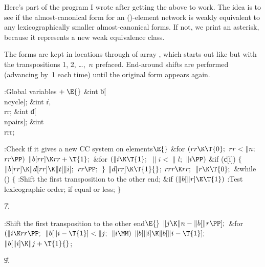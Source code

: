 Here's part of the program I wrote after getting the above
to work.
The idea is to see if the almost-canonical form for an ()-element
network is weakly equivalent to any lexicographically smaller
almost-canonical forms. If not, we print an asterisk, because it
represents a new weak equivalence class.

The forms are kept in locations  through  of array ,
which starts out like  but with the transpositions 1, 2, \dots,~$n$
prefaced. End-around shifts are performed (advancing  by~1 each time)
until the original form appears again.

\Y\B\4:Global variables\X${}\mathrel+\E{}$\6
\&{int} \|b[\\{ncycle}];\6
\&{int} \|r${},{}$ \\{rr};%
\6
\&{int} \|d[\\{npairs}];\6
\&{int} \\{rrr};\par
\fi

\B{}:Check if it gives a new CC system on 
elements\X${}\E{}$\6
\&{for} ${}(\\{rr}\K\T{0};{}$ ${}\\{rr}<\|n;{}$ ${}\\{rr}\PP){}$\1\5
${}\|b[\\{rr}]\K\\{rr}+\T{1};{}$\2\6
\&{for} ${}(\|i\K\T{1};{}$ ${}\|i<\|l;{}$ ${}\|i\PP){}$\1\6
\&{if} (\|c[\|i])\5
${}\{{}$\1\6
${}\|b[\\{rr}]\K\|d[\\{rr}]\K\|t[\|i];{}$\6
${}\\{rr}\PP;{}$\6
\4${}\}{}$\2\2\6
${}\|d[\\{rr}]\K\T{1}{}$;\6
${}\\{rrr}\K\\{rr};{}$\6
${}\|r\K\T{0};{}$\6
\&{while} ()\5
${}\{{}$\1\6
:Shift the first transposition to the other end\X;\6
\&{if} ${}(\|b[\|r]\E\T{1}){}$\1\5
:Test lexicographic order;  if equal or less\X;\2\6
\4${}\}{}$\2\par
\U7.\fi

\B{}:Shift the first transposition to the other end\X${}%
\E{}$\6
$\|j\K\|n-\|b[\|r\PP];{}$\6
\&{for} ${}(\|i\K\\{rr}\PP;{}$ ${}\|b[\|i-\T{1}]<\|j;{}$ ${}\|i\MM){}$\1\5
${}\|b[\|i]\K\|b[\|i-\T{1}];{}$\2\6
${}\|b[\|i]\K\|j+\T{1}{}$;\par
\U9.\fi

